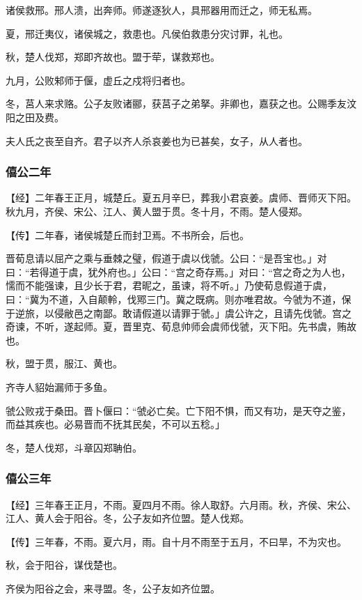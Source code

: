 \documentclass[]{article}
\begin{document}
诸侯救邢。邢人溃，出奔师。师遂逐狄人，具邢器用而迁之，师无私焉。

夏，邢迁夷仪，诸侯城之，救患也。凡侯伯救患分灾讨罪，礼也。

秋，楚人伐郑，郑即齐故也。盟于荦，谋救郑也。

九月，公败邾师于偃，虚丘之戍将归者也。

冬，莒人来求赂。公子友败诸郦，获莒子之弟拏。非卿也，嘉获之也。公赐季友汶阳之田及费。

夫人氏之丧至自齐。君子以齐人杀哀姜也为已甚矣，女子，从人者也。

\hypertarget{header-n659}{%
\subsubsection{僖公二年}\label{header-n659}}

【经】二年春王正月，城楚丘。夏五月辛巳，葬我小君哀姜。虞师、晋师灭下阳。秋九月，齐侯、宋公、江人、黄人盟于贯。冬十月，不雨。楚人侵郑。

【传】二年春，诸侯城楚丘而封卫焉。不书所会，后也。

晋荀息请以屈产之乘与垂棘之璧，假道于虞以伐虢。公曰：``是吾宝也。」对曰：``若得道于虞，犹外府也。」公曰：``宫之奇存焉。」对曰：``宫之奇之为人也，懦而不能强谏，且少长于君，君昵之，虽谏，将不听。」乃使荀息假道于虞，曰：``冀为不道，入自颠軨，伐鄍三门。冀之既病。则亦唯君故。今虢为不道，保于逆旅，以侵敝邑之南鄙。敢请假道以请罪于虢。」虞公许之，且请先伐虢。宫之奇谏，不听，遂起师。夏，晋里克、荀息帅师会虞师伐虢，灭下阳。先书虞，贿故也。

秋，盟于贯，服江、黄也。

齐寺人貂始漏师于多鱼。

虢公败戎于桑田。晋卜偃曰：``虢必亡矣。亡下阳不惧，而又有功，是天夺之鉴，而益其疾也。必易晋而不抚其民矣，不可以五稔。」

冬，楚人伐郑，斗章囚郑聃伯。

\hypertarget{header-n669}{%
\subsubsection{僖公三年}\label{header-n669}}

【经】三年春王正月，不雨。夏四月不雨。徐人取舒。六月雨。秋，齐侯、宋公、江人、黄人会于阳谷。冬，公子友如齐位盟。楚人伐郑。

【传】三年春，不雨。夏六月，雨。自十月不雨至于五月，不曰旱，不为灾也。

秋，会于阳谷，谋伐楚也。

齐侯为阳谷之会，来寻盟。冬，公子友如齐位盟。
\end{document}
